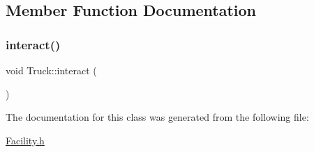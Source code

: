 \subsection{Member Function Documentation}
\mbox{\label{classTruck_ade3385f07d9db954d329e3d5de180f2e}} 
\subsubsection{\texorpdfstring{interact()}{interact()}}
{\footnotesize\ttfamily void Truck\+::interact (\begin{DoxyParamCaption}{ }\end{DoxyParamCaption})}



The documentation for this class was generated from the following file\+:\begin{DoxyCompactItemize}
\item 
\mbox{\hyperlink{Facility_8h}{Facility.\+h}}\end{DoxyCompactItemize}
